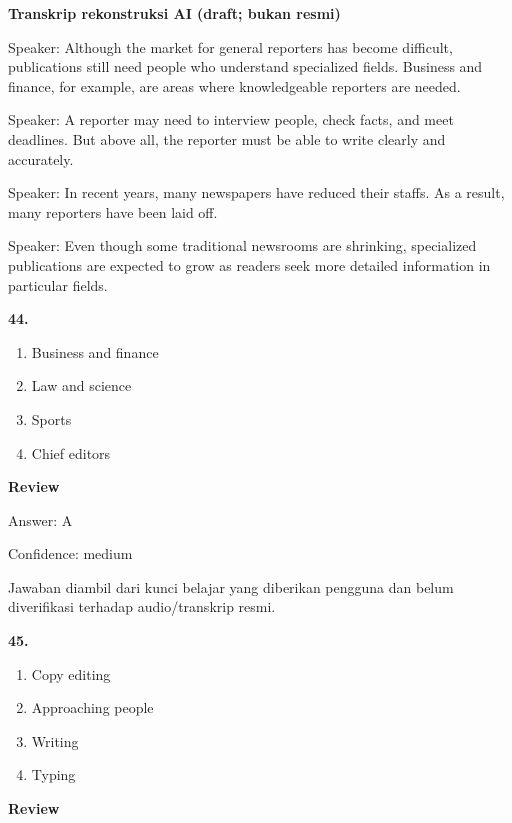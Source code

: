 \documentclass[12pt]{article}
\begin{document}
\begin{exampleblock}
\textbf{Transkrip rekonstruksi AI (draft; bukan resmi)}\par
Speaker: Although the market for general reporters has become difficult, publications still need people who understand specialized fields. Business and finance, for example, are areas where knowledgeable reporters are needed.\par
Speaker: A reporter may need to interview people, check facts, and meet deadlines. But above all, the reporter must be able to write clearly and accurately.\par
Speaker: In recent years, many newspapers have reduced their staffs. As a result, many reporters have been laid off.\par
Speaker: Even though some traditional newsrooms are shrinking, specialized publications are expected to grow as readers seek more detailed information in particular fields.\par
\end{exampleblock}
\noindent\textbf{44.}
\begin{enumerate}[label=(\Alph*),leftmargin=*,itemsep=0.2em]
\item Business and finance
\item Law and science
\item Sports
\item Chief editors
\end{enumerate}
\par
\begingroup
\setlength{\parskip}{0pt}
\setlength{\parindent}{0pt}
\textbf{Review}\par
Answer: A\par
Confidence: medium\par
Jawaban diambil dari kunci belajar yang diberikan pengguna dan belum diverifikasi terhadap audio/transkrip resmi.\par
\endgroup
\par
\vspace{0.25\baselineskip}
\noindent\textbf{45.}
\begin{enumerate}[label=(\Alph*),leftmargin=*,itemsep=0.2em]
\item Copy editing
\item Approaching people
\item Writing
\item Typing
\end{enumerate}
\par
\begingroup
\setlength{\parskip}{0pt}
\setlength{\parindent}{0pt}
\textbf{Review}\par
\end{document}
